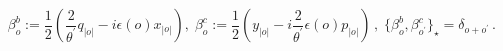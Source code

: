 \begin{equation}
\beta _{o}^{b}:={\frac{1}{2}}\left( {\frac{2}{{\theta ^{\prime }}}}%
q_{|o|}-i\epsilon (o)x_{|o|}\right) ,\;\beta _{o}^{c}:={\frac{1}{2}}\left(
y_{|o|}-i{\frac{2}{{\theta ^{\prime }}}}\epsilon (o)p_{|o|}\right)
\,,\;\{\beta _{o}^{b},\beta _{o^{\prime }}^{c}\}_{\star }=\delta
_{o+o^{\prime }}\,.~~~~  \label{oddmode_fields}
\end{equation}

